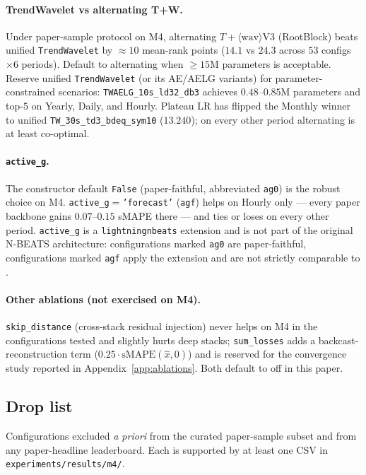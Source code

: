 \documentclass[11pt,a4paper]{article}
\begin{document}
\paragraph{TrendWavelet vs alternating T+W.} Under paper-sample protocol on M4, alternating $T{+}\langle\text{wav}\rangle$V3 (RootBlock) beats unified \texttt{TrendWavelet} by $\approx 10$ mean-rank points ($14.1$ vs $24.3$ across $53$ configs $\times 6$ periods). Default to alternating when $\geq 15$M parameters is acceptable. Reserve unified \texttt{TrendWavelet} (or its AE/AELG variants) for parameter-constrained scenarios: \texttt{TWAELG\_10s\_ld32\_db3} achieves $0.48$--$0.85$M parameters and top-$5$ on Yearly, Daily, and Hourly. Plateau LR has flipped the Monthly winner to unified \texttt{TW\_30s\_td3\_bdeq\_sym10} ($13.240$); on every other period alternating is at least co-optimal.

\paragraph{\texttt{active\_g}.} The constructor default \texttt{False} (paper-faithful, abbreviated \texttt{ag0}) is the robust choice on M4. \texttt{active\_g}$=$\texttt{'forecast'} (\texttt{agf}) helps on Hourly only --- every paper backbone gains $0.07$--$0.15$ sMAPE there --- and ties or loses on every other period. \texttt{active\_g} is a \texttt{lightningnbeats} extension and is not part of the original N-BEATS architecture: configurations marked \texttt{ag0} are paper-faithful, configurations marked \texttt{agf} apply the extension and are not strictly comparable to \citet{oreshkin2020nbeats}.

\paragraph{Other ablations (not exercised on M4).} \texttt{skip\_distance} (cross-stack residual injection) never helps on M4 in the configurations tested and slightly hurts deep stacks; \texttt{sum\_losses} adds a backcast-reconstruction term ($0.25 \cdot \mathrm{sMAPE}(\hat{x}, 0)$) and is reserved for the convergence study reported in Appendix~\ref{app:ablations}. Both default to off in this paper.

\subsection{Drop list}
\label{app:hyperparams:drop}

Configurations excluded \emph{a priori} from the curated paper-sample subset and from any paper-headline leaderboard. Each is supported by at least one CSV in \texttt{experiments/results/m4/}.
\end{document}
